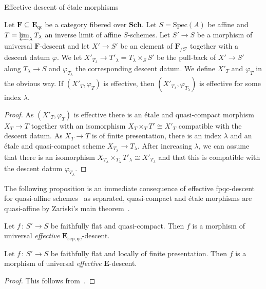 \documentclass[a4paper,twoside,11pt]{amsart}[2009/07/02] %
\newcommand{\iso}{\cong} %
\newcommand{\map}[3]{#1\,:\, #2\rightarrow #3}
\newcommand{\etale}{\'{e}tale}
\newcommand{\Sch}{\mathbf{Sch}} %
\newcommand{\Spec}{\mathrm{Spec}}
\newcommand{\sep}{\mathrm{sep}}
\newcommand{\catE}{\mathbf{E}}
\newcommand{\catF}{\mathbf{F}}
\newcommand{\qc}{\mathrm{qc}}
\begin{document}
\begin{section}{Effective descent of \etale{} morphisms}
\begin{proposition}\label{P:effectiveness-under-limits-2}
Let $\catF\subseteq \catE_{\qc}$ be a category fibered over $\Sch$. Let
$S=\Spec(A)$ be affine and $T=\varprojlim_\lambda T_\lambda$ an inverse limit
of affine $S$-schemes. Let $S'\to S$ be a morphism of universal $\catF$-descent
and let $X'\to S'$ be an element of $\catF_{/S'}$ together with a descent datum
$\varphi$. We let $X'_{T_\lambda}\to T'_\lambda=T_\lambda\times_S S'$ be the
pull-back of $X'\to S'$ along $T_\lambda\to S$ and $\varphi_{T_\lambda}$ the
corresponding descent datum. We define $X'_T$ and $\varphi_T$ in the obvious
way.
%
If $(X'_T,\varphi_T)$ is effective, then $(X'_{T_\lambda},\varphi_{T_\lambda})$
is effective for some index $\lambda$.
\end{proposition}
\begin{proof}
As $(X'_T,\varphi_T)$ is effective there is an \etale{} and quasi-compact
morphism $X_T\to T$ together with an isomorphism $X_T\times_T T'\iso X'_T$
compatible with the descent datum. As $X_T\to T$ is of finite presentation,
there is an index $\lambda$ and an \etale{} and quasi-compact scheme
$X_{T_\lambda}\to T_\lambda$. After increasing $\lambda$, we can assume
that there is an isomorphism $X_{T_\lambda} \times_{T_\lambda} T'_\lambda
\iso X'_{T_\lambda}$ and that this is compatible with the descent datum
$\varphi_{T_\lambda}$.
\end{proof}


The following proposition is an immediate consequence of effective
fpqc-descent for quasi-affine schemes~\cite[Exp.~VIII, Cor.~7.9]{sga1}
as separated, quasi-compact and \etale{} morphisms are quasi-affine by
Zariski's main theorem~\cite[Thm.~8.12.6]{egaIV}.

\begin{proposition}\label{P:fpqc-descent}
Let $\map{f}{S'}{S}$ be faithfully flat and quasi-compact. Then $f$ is
a morphism of universal \emph{effective} $\catE_{\sep,\qc}$-descent.
\end{proposition}

\begin{proposition}\label{P:fppf-descent}
Let $\map{f}{S'}{S}$ be faithfully flat and locally of finite presentation.
Then $f$ is a morphism of universal \emph{effective} $\catE$-descent.
\end{proposition}
\begin{proof}
This follows from~\cite[Cor.~10.4.2]{laumon}.
\end{proof}


\end{section}
\end{document}
